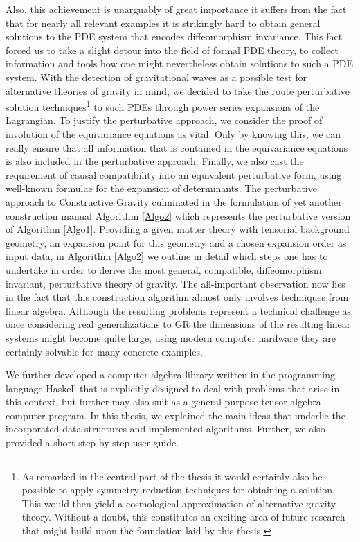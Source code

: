 Also, this achievement is unarguably of great importance it suffers from the fact that for nearly all relevant examples it is strikingly hard to obtain general solutions to the 
PDE system that encodes diffeomorphism invariance. 
This fact forced us to take a slight detour into the field of formal PDE theory, to collect information and tools how one might nevertheless obtain solutions to such a PDE system. 
With the detection of gravitational waves as a possible test for alternative theories of gravity in mind, we decided to take the route perturbative solution techniques\footnote{As remarked in the central part of the thesis it would certainly also be possible to apply symmetry reduction techniques for obtaining a solution. This would then yield a cosmological approximation of alternative gravity theory. Without a doubt, this constitutes an exciting area of future research that might build upon the foundation laid by this thesis.} to such PDEs through power series expansions of the Lagrangian. To justify the perturbative approach, we consider the proof of involution of the equivariance equations
as vital. Only by knowing this, we can really ensure that all information that is contained in the equivariance equations is also included in the perturbative approach. 
Finally, we also cast the requirement of causal compatibility into an equivalent perturbative form, using well-known formulae for the expansion of determinants. The perturbative approach to Constructive Gravity culminated in the formulation of yet another construction manual Algorithm \ref{Algo2} which represents the perturbative version of Algorithm \ref{Algo1}. Providing a given matter theory with tensorial background geometry, an expansion point for this geometry and a chosen expansion order as input data, in Algorithm \ref{Algo2} we outline in detail which steps one has to undertake in order to derive the most general, compatible, diffeomorphism invariant, perturbative theory of gravity. The all-important observation now lies in the fact that this construction algorithm almost only involves techniques from linear algebra. Although the resulting problems represent a technical challenge as once considering real generalizations to GR the dimensions of the resulting linear systems might become quite large, using modern computer hardware they are certainly solvable for many concrete examples. 

We further developed a computer algebra library written in the programming language Haskell that is explicitly designed to deal with problems that arise in this context, but further may also suit as a general-purpose tensor algebra computer program. 
In this thesis, we explained the main ideas that underlie the incorporated data structures and implemented algorithms. Further, we also provided a short step by step user guide. 

